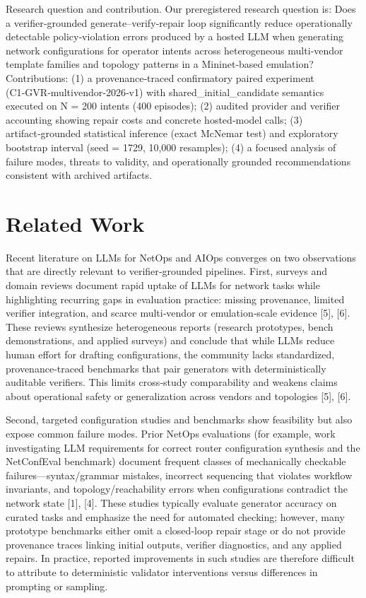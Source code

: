\documentclass[conference]{IEEEtran}
\begin{document}
Research question and contribution. Our preregistered research question is: Does a verifier‑grounded generate--verify‑repair loop significantly reduce operationally detectable policy‑violation errors produced by a hosted LLM when generating network configurations for operator intents across heterogeneous multi‑vendor template families and topology patterns in a Mininet‑based emulation? Contributions: (1) a provenance‑traced confirmatory paired experiment (C1‑GVR‑multivendor‑2026‑v1) with shared\_initial\_candidate semantics executed on N = 200 intents (400 episodes); (2) audited provider and verifier accounting showing repair costs and concrete hosted‑model calls; (3) artifact‑grounded statistical inference (exact McNemar test) and exploratory bootstrap interval (seed = 1729, 10,000 resamples); (4) a focused analysis of failure modes, threats to validity, and operationally grounded recommendations consistent with archived artifacts.

\section{Related Work}
Recent literature on LLMs for NetOps and AIOps converges on two observations that are directly relevant to verifier‑grounded pipelines. First, surveys and domain reviews document rapid uptake of LLMs for network tasks while highlighting recurring gaps in evaluation practice: missing provenance, limited verifier integration, and scarce multi‑vendor or emulation‑scale evidence [5], [6]. These reviews synthesize heterogeneous reports (research prototypes, bench demonstrations, and applied surveys) and conclude that while LLMs reduce human effort for drafting configurations, the community lacks standardized, provenance‑traced benchmarks that pair generators with deterministically auditable verifiers. This limits cross‑study comparability and weakens claims about operational safety or generalization across vendors and topologies [5], [6].

Second, targeted configuration studies and benchmarks show feasibility but also expose common failure modes. Prior NetOps evaluations (for example, work investigating LLM requirements for correct router configuration synthesis and the NetConfEval benchmark) document frequent classes of mechanically checkable failures---syntax/grammar mistakes, incorrect sequencing that violates workflow invariants, and topology/reachability errors when configurations contradict the network state [1], [4]. These studies typically evaluate generator accuracy on curated tasks and emphasize the need for automated checking; however, many prototype benchmarks either omit a closed‑loop repair stage or do not provide provenance traces linking initial outputs, verifier diagnostics, and any applied repairs. In practice, reported improvements in such studies are therefore difficult to attribute to deterministic validator interventions versus differences in prompting or sampling.
\end{document}
